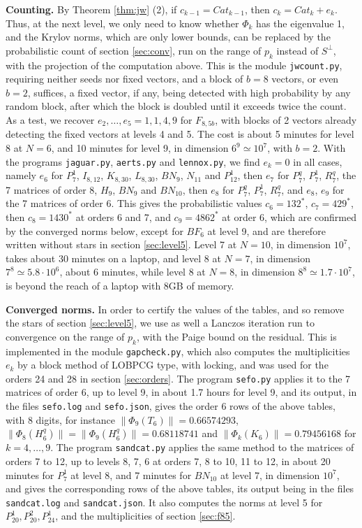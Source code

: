 \documentclass[11pt]{amsart}
\begin{document}
\noindent\textbf{Counting.} By Theorem \ref{thm:jw} (2), if $c_{k-1}=Cat_{k-1}$, then $c_k=Cat_k+e_k$. Thus, at the next level, we only need to know whether $\Phi_k$ has the eigenvalue 1, and the Krylov norms, which are only lower bounds, can be replaced by the probabilistic count of section \ref{sec:conv}, run on the range of $p_k$ instead of $S^\perp$, with the projection of the computation above. This is the module \texttt{jwcount.py}, requiring neither seeds nor fixed vectors, and a block of $b=8$ vectors, or even $b=2$, suffices, a fixed vector, if any, being detected with high probability by any random block, after which the block is doubled until it exceeds twice the count. As a test, we recover $e_2,\ldots,e_5=1,1,4,9$ for $F_{8,5b}$, with blocks of 2 vectors already detecting the fixed vectors at levels 4 and 5. The cost is about 5 minutes for level 8 at $N=6$, and 10 minutes for level 9, in dimension $6^9\simeq10^7$, with $b=2$. With the programs \texttt{jaguar.py}, \texttt{aerts.py} and \texttt{lennox.py}, we find $e_k=0$ in all cases, namely $e_6$ for $P_7^1$, $I_{8,12}$, $K_{8,30}$, $L_{8,30}$, $BN_9$, $N_{11}$ and $P_{12}^1$, then $e_7$ for $P_7^q$, $P_7^1$, $R_7^q$, the 7 matrices of order 8, $H_9$, $BN_9$ and $BN_{10}$, then $e_8$ for $P_7^q$, $P_7^1$, $R_7^q$, and $e_8$, $e_9$ for the 7 matrices of order 6. This gives the probabilistic values $c_6=132^*$, $c_7=429^*$, then $c_8=1430^*$ at orders 6 and 7, and $c_9=4862^*$ at order 6, which are confirmed by the converged norms below, except for $BF_6$ at level 9, and are therefore written without stars in section \ref{sec:level5}. Level 7 at $N=10$, in dimension $10^7$, takes about 30 minutes on a laptop, and level 8 at $N=7$, in dimension $7^8\simeq5.8\cdot10^6$, about 6 minutes, while level 8 at $N=8$, in dimension $8^8\simeq1.7\cdot10^7$, is beyond the reach of a laptop with 8GB of memory.

\medskip

\noindent\textbf{Converged norms.} In order to certify the values of the tables, and so remove the stars of section \ref{sec:level5}, we use as well a Lanczos iteration run to convergence on the range of $p_k$, with the Paige bound on the residual. This is implemented in the module \texttt{gapcheck.py}, which also computes the multiplicities $e_k$ by a block method of LOBPCG type, with locking, and was used for the orders 24 and 28 in section \ref{sec:orders}. The program \texttt{sefo.py} applies it to the 7 matrices of order 6, up to level 9, in about 1.7 hours for level 9, and its output, in the files \texttt{sefo.log} and \texttt{sefo.json}, gives the order 6 rows of the above tables, with 8 digits, for instance $\|\Phi_9(T_6)\|=0.66574293$, $\|\Phi_8(H_6^q)\|=\|\Phi_9(H_6^q)\|=0.68118741$ and $\|\Phi_k(K_6)\|=0.79456168$ for $k=4,\ldots,9$. The program \texttt{sandcat.py} applies the same method to the matrices of orders 7 to 12, up to levels 8, 7, 6 at orders 7, 8 to 10, 11 to 12, in about 20 minutes for $P_7^1$ at level 8, and 7 minutes for $BN_{10}$ at level 7, in dimension $10^7$, and gives the corresponding rows of the above tables, its output being in the files \texttt{sandcat.log} and \texttt{sandcat.json}. It also computes the norms at level 5 for $P_{20}^1,P_{20}^2,P_{24}^1$, and the multiplicities of section \ref{sec:f85}.
\end{document}
